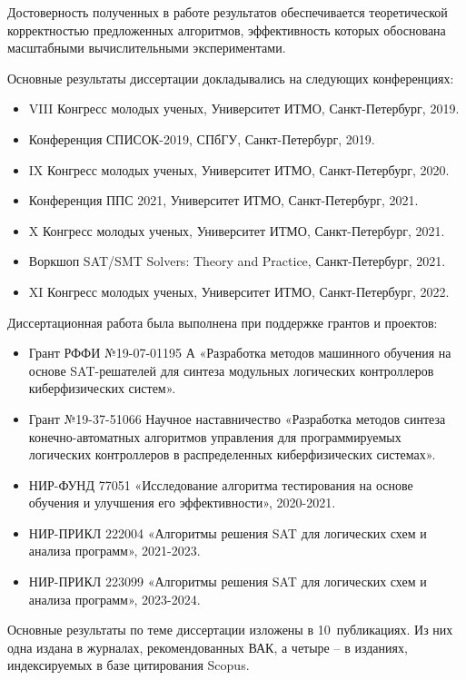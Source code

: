 {\reliability}
%
Достоверность полученных в работе результатов обеспечивается теоретической корректностью предложенных алгоритмов, эффективность которых обоснована масштабными вычислительными экспериментами.


\probation
%
Основные результаты диссертации докладывались на следующих конференциях:
\begin{itemize}[beginpenalty=10000]
    \item VIII Конгресс молодых ученых, Университет ИТМО, Санкт-Петербург, 2019.
    \item Конференция СПИСОК-2019, СПбГУ, Санкт-Петербург, 2019.
    \item IX Конгресс молодых ученых, Университет ИТМО, Санкт-Петербург, 2020.
    \item Конференция ППС 2021, Университет ИТМО, Санкт-Петербург, 2021.
    \item X Конгресс молодых ученых, Университет ИТМО, Санкт-Петербург, 2021.
    \item Воркшоп SAT/SMT Solvers: Theory and Practice, Санкт-Петербург, 2021.
    \item XI Конгресс молодых ученых, Университет ИТМО, Санкт-Петербург, 2022.
\end{itemize}

Диссертационная работа была выполнена при поддержке грантов и проектов:
\begin{itemize}[beginpenalty=10000]
    \item Грант РФФИ №19-07-01195 А «Разработка методов машинного
    обучения на основе SAT-решателей для синтеза модульных логических контроллеров киберфизических систем».
    \item Грант №19-37-51066 Научное наставничество «Разработка методов синтеза конечно-автоматных алгоритмов управления для программируемых логических контроллеров в распределенных киберфизических системах».
    \item НИР-ФУНД 77051 «Исследование алгоритма тестирования на основе обучения и улучшения его эффективности», 2020-2021.
    \item НИР-ПРИКЛ 222004 «Алгоритмы решения SAT для логических схем и анализа программ», 2021-2023.
    \item НИР-ПРИКЛ 223099 «Алгоритмы решения SAT для логических схем и анализа программ», 2023-2024.
\end{itemize}


\publications
%
%
Основные результаты по теме диссертации изложены в 10~публикациях.
Из них одна издана в журналах, рекомендованных ВАК,
а четыре \--- в изданиях, индексируемых в базе цитирования Scopus.

